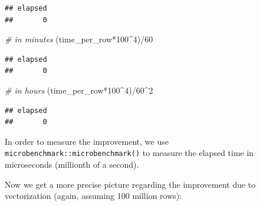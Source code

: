 \documentclass[
  12pt,
]{style/krantz}
\newenvironment{Shaded}{\begin{snugshade}}{\end{snugshade}}
\newcommand{\CommentTok}[1]{\textcolor[rgb]{0.56,0.35,0.01}{\textit{#1}}}
\newcommand{\DecValTok}[1]{\textcolor[rgb]{0.00,0.00,0.81}{#1}}
\newcommand{\FunctionTok}[1]{\textcolor[rgb]{0.00,0.00,0.00}{#1}}
\newcommand{\NormalTok}[1]{#1}
\newcommand{\OtherTok}[1]{\textcolor[rgb]{0.56,0.35,0.01}{#1}}
\newcommand{\SpecialCharTok}[1]{\textcolor[rgb]{0.00,0.00,0.00}{#1}}
\begin{document}
\begin{verbatim}
## elapsed 
##       0
\end{verbatim}

\begin{Shaded}
\begin{Highlighting}[]
\CommentTok{\# in minutes}
\NormalTok{(time\_per\_row}\SpecialCharTok{*}\DecValTok{100}\SpecialCharTok{\^{}}\DecValTok{4}\NormalTok{)}\SpecialCharTok{/}\DecValTok{60} 
\end{Highlighting}
\end{Shaded}

\begin{verbatim}
## elapsed 
##       0
\end{verbatim}

\begin{Shaded}
\begin{Highlighting}[]
\CommentTok{\# in hours}
\NormalTok{(time\_per\_row}\SpecialCharTok{*}\DecValTok{100}\SpecialCharTok{\^{}}\DecValTok{4}\NormalTok{)}\SpecialCharTok{/}\DecValTok{60}\SpecialCharTok{\^{}}\DecValTok{2} 
\end{Highlighting}
\end{Shaded}

\begin{verbatim}
## elapsed 
##       0
\end{verbatim}

In order to measure the improvement, we use \texttt{microbenchmark::microbenchmark()} to measure the elapsed time in microseconds (millionth of a second).

\begin{Shaded}
\end{Shaded}

Now we get a more precise picture regarding the improvement due to vectorization (again, assuming 100 million rows):
\end{document}
